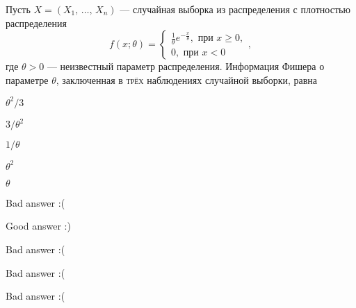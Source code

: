 
\begin{question}
Пусть \(X = (X_1, \, \ldots, \, X_n)\) — случайная выборка из
распределения с плотностью распределения \[
f(x; \theta) =
\begin{cases}
\frac{1}{\theta} e^{-\frac{x}{\theta}}, \text{ при } x \geq 0, \\
0, \text{ при } x < 0
\end{cases},
\] где \(\theta > 0\) — неизвестный параметр распределения. Информация
Фишера о параметре \(\theta\), заключенная в \textsc{трёх} наблюдениях
случайной выборки, равна
\begin{answerlist}
  \item \(\theta^2 / 3\)
  \item \(3 / \theta^2\)
  \item \(1 / \theta\)
  \item \(\theta^2\)
  \item \(\theta\)
\end{answerlist}
\end{question}

\begin{solution}
\begin{answerlist}
  \item Bad answer :(
  \item Good answer :)
  \item Bad answer :(
  \item Bad answer :(
  \item Bad answer :(
\end{answerlist}
\end{solution}

